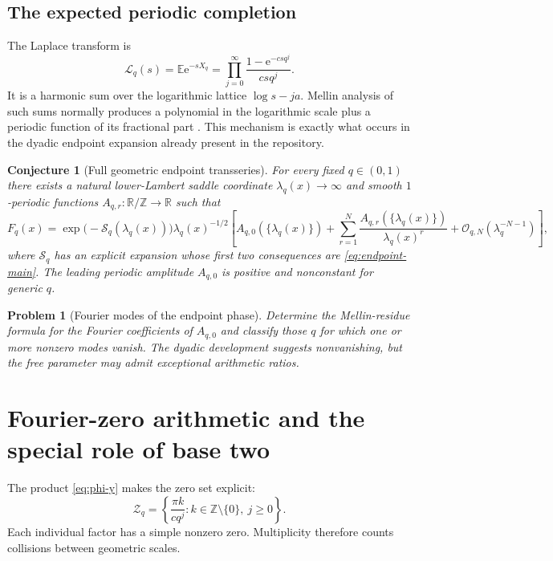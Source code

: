 \documentclass[11pt,oneside]{article}
\newtheorem{conjecture}[theorem]{Conjecture}
\newtheorem{problem}[theorem]{Problem}
\theoremstyle{definition}
\theoremstyle{remark}
\newcommand{\R}{\mathbb R}
\newcommand{\Z}{\mathbb Z}
\newcommand{\E}{\mathbb E}
\newcommand{\e}{\mathrm e}
\newcommand{\bigO}{\mathcal O}
\begin{document}
\subsection{The expected periodic completion}

The Laplace transform is
\begin{equation}
 \mathcal L_q(s)=\E\e^{-sX_q}
 =\prod_{j=0}^{\infty}\frac{1-\e^{-csq^j}}{csq^j}.          \label{eq:laplace-product}
\end{equation}
It is a harmonic sum over the logarithmic lattice $\log s-ja$.  Mellin analysis of such
sums normally produces a polynomial in the logarithmic scale plus a periodic function of its
fractional part \cite{flajolet1995}.  This mechanism is exactly what occurs in the dyadic
endpoint expansion already present in the repository.

\begin{conjecture}[Full geometric endpoint transseries]
\label{conj:q-transseries}
For every fixed $q\in(0,1)$ there exists a natural lower-Lambert saddle coordinate
$\lambda_q(x)\to\infty$ and smooth $1$-periodic functions
$A_{q,r}:\R/\Z\to\R$ such that
\begin{equation}
 F_q(x)
 =\exp\bigl(-\mathcal S_q(\lambda_q(x))\bigr)
  \lambda_q(x)^{-1/2}
  \left[
   A_{q,0}(\{\lambda_q(x)\})
   +\sum_{r=1}^{N}\frac{A_{q,r}(\{\lambda_q(x)\})}{\lambda_q(x)^r}
   +\bigO_{q,N}(\lambda_q^{-N-1})
  \right],                                                  \label{eq:q-transseries}
\end{equation}
where $\mathcal S_q$ has an explicit expansion whose first two consequences are
\eqref{eq:endpoint-main}.  The leading periodic amplitude $A_{q,0}$ is positive and
nonconstant for generic $q$.
\end{conjecture}

\begin{problem}[Fourier modes of the endpoint phase]
Determine the Mellin-residue formula for the Fourier coefficients of $A_{q,0}$ and classify
those $q$ for which one or more nonzero modes vanish.  The dyadic development suggests
nonvanishing, but the free parameter may admit exceptional arithmetic ratios.
\end{problem}

\section{Fourier-zero arithmetic and the special role of base two}
\label{sec:zeros}

The product \eqref{eq:phi-y} makes the zero set explicit:
\begin{equation}
 \mathcal Z_q
 =\left\{\frac{\pi k}{cq^j}: k\in\Z\setminus\{0\},\ j\ge0\right\}. \label{eq:zero-set}
\end{equation}
Each individual factor has a simple nonzero zero.  Multiplicity therefore counts collisions
between geometric scales.
\end{document}
